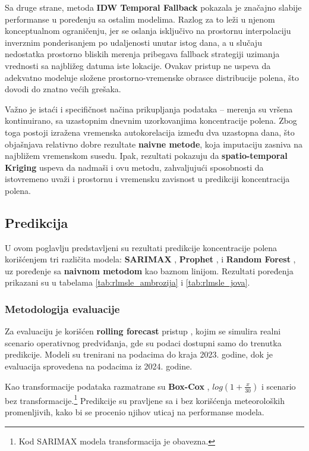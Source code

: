 \documentclass[12pt]{article}
\begin{document}
Sa druge strane, metoda \textbf{IDW Temporal Fallback} pokazala je značajno slabije performanse u poređenju sa ostalim modelima. Razlog za to leži u njenom konceptualnom ograničenju, jer se oslanja isključivo na prostornu interpolaciju inverznim ponderisanjem po udaljenosti unutar istog dana, a u slučaju nedostatka prostorno bliskih merenja pribegava fallback strategiji uzimanja vrednosti sa najbližeg datuma iste lokacije. Ovakav pristup ne uspeva da adekvatno modeluje složene prostorno-vremenske obrasce distribucije polena, što dovodi do znatno većih grešaka.

Važno je istaći i specifičnost načina prikupljanja podataka – merenja su vršena kontinuirano, sa uzastopnim dnevnim uzorkovanjima koncentracije polena. Zbog toga postoji izražena vremenska autokorelacija između dva uzastopna dana, što objašnjava relativno dobre rezultate \textbf{naivne metode}, koja imputaciju zasniva na najbližem vremenskom susedu. Ipak, rezultati pokazuju da \textbf{spatio-temporal Kriging} uspeva da nadmaši i ovu metodu, zahvaljujući sposobnosti da istovremeno uvaži i prostornu i vremensku zavisnost u predikciji koncentracija polena.

\subsection{Predikcija}

U ovom poglavlju predstavljeni su rezultati predikcije koncentracije polena korišćenjem tri različita modela: \textbf{SARIMAX} \cite{box1970, hyndman2018forecasting}, \textbf{Prophet} \cite{taylor2018}, i \textbf{Random Forest} \cite{breiman2001}, uz poređenje sa \textbf{naivnom metodom} kao baznom linijom. Rezultati poređenja prikazani su u tabelama \ref{tab:rlmsle_ambrozija} i \ref{tab:rlmsle_jova}.

\subsubsection{Metodologija evaluacije}

Za evaluaciju je korišćen \textbf{rolling forecast} pristup \cite{bergmeir2012use}, kojim se simulira realni scenario operativnog predviđanja, gde su podaci dostupni samo do trenutka predikcije. Modeli su trenirani na podacima do kraja 2023. godine, dok je evaluacija sprovedena na podacima iz 2024. godine. 

Kao transformacije podataka razmatrane su \textbf{Box-Cox} \cite{boxcox1964}, \textbf{$log(1 + \frac{x}{30})$} i scenario bez transformacije.\footnote{Kod SARIMAX modela transformacija je obavezna.}  
Predikcije su pravljene sa i bez korišćenja meteoroloških promenljivih, kako bi se procenio njihov uticaj na performanse modela.  
\end{document}
